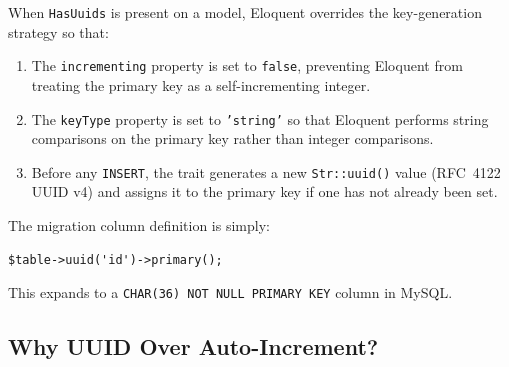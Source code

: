 When \texttt{HasUuids} is present on a model, Eloquent overrides the
key-generation strategy so that:

\begin{enumerate}
  \item The \texttt{incrementing} property is set to \texttt{false},
    preventing Eloquent from treating the primary key as a
    self-incrementing integer.
  \item The \texttt{keyType} property is set to \texttt{'string'} so
    that Eloquent performs string comparisons on the primary key rather
    than integer comparisons.
  \item Before any \texttt{INSERT}, the trait generates a new
    \texttt{Str::uuid()} value (RFC~4122 UUID v4) and assigns it to the
    primary key if one has not already been set.
\end{enumerate}

The migration column definition is simply:

\begin{lstlisting}[style=php, caption={UUID primary key column definition.}, label={lst:uuid-col}]
$table->uuid('id')->primary();
\end{lstlisting}

This expands to a \texttt{CHAR(36) NOT NULL PRIMARY KEY} column in MySQL.

\subsection{Why UUID Over Auto-Increment?}

